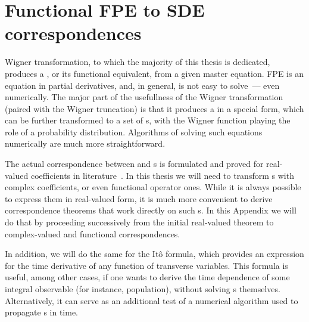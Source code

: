 \chapter{Functional FPE to SDE correspondences}
\label{cha:appendix:fpe-sde}

Wigner transformation, to which the majority of this thesis is dedicated, produces a , or its functional equivalent, from a given master equation.
FPE is an equation in partial derivatives, and, in general, is not easy to solve~--- even numerically.
The major part of the usefullness of the Wigner transformation (paired with the Wigner truncation) is that it produces a  in a special form, which can be further transformed to a set of s, with the Wigner function playing the role of a probability distribution.
Algorithms of solving such equations numerically are much more straightforward.

The actual correspondence between  and s is formulated and proved for real-valued coefficients in literature~\cite{Risken1996}.
In this thesis we will need to transform s with complex coefficients, or even functional operator ones.
While it is always possible to express them in real-valued form, it is much more convenient to derive correspondence theorems that work directly on such s.
In this Appendix we will do that by proceeding successively from the initial real-valued theorem to complex-valued and functional correspondences.

In addition, we will do the same for the It\^o formula, which provides an expression for the time derivative of any function of transverse variables.
This formula is useful, among other cases, if one wants to derive the time dependence of some integral observable (for instance, population), without solving s themselves.
Alternatively, it can serve as an additional test of a numerical algorithm used to propagate s in time.



